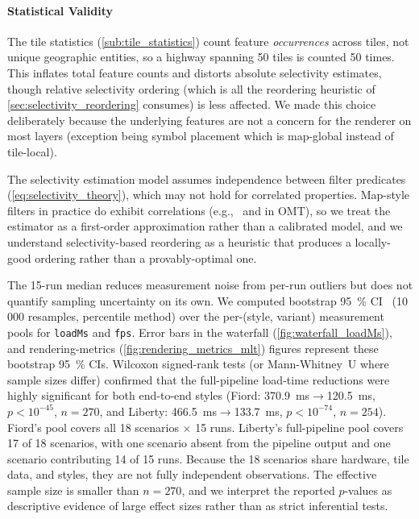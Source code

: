 \paragraph{Statistical Validity}
The tile statistics (\cref{sub:tile_statistics}) count feature \emph{occurrences} across tiles, not unique geographic entities, so a highway spanning 50 tiles is counted 50 times.
This inflates total feature counts and distorts absolute selectivity estimates, though relative selectivity ordering (which is all the reordering heuristic of \cref{sec:selectivity_reordering} consumes) is less affected.
We made this choice deliberately because the underlying features are not a concern for the renderer on most layers (exception being symbol placement which is map-global instead of tile-local).

The selectivity estimation model assumes independence between filter predicates (\cref{eq:selectivity_theory}), which may not hold for correlated properties.
Map-style filters in practice do exhibit correlations (e.g.,\  and  in \ac{OMT}), so we treat the estimator as a first-order approximation rather than a calibrated model, and we understand selectivity-based reordering as a heuristic that produces a locally-good ordering rather than a provably-optimal one.

The 15-run median reduces measurement noise from per-run outliers but does not quantify sampling uncertainty on its own.
We computed bootstrap \qty{95}{\percent} \ac{CI}~\cite{efronIntroductionBootstrap1998} (10\,000 resamples, percentile method) over the per-(style, variant) measurement pools for \texttt{loadMs} and \texttt{fps}.
Error bars in the waterfall (\cref{fig:waterfall_loadMs}), and rendering-metrics (\cref{fig:rendering_metrics_mlt}) figures represent these bootstrap \qty{95}{\percent} CIs.
Wilcoxon signed-rank tests (or Mann-Whitney~U where sample sizes differ) confirmed that the full-pipeline load-time reductions were highly significant for both end-to-end styles (Fiord: \qty{370.9}{\milli\second}$\to$\qty{120.5}{\milli\second}, $p < 10^{-45}$, $n = 270$, and Liberty: \qty{466.5}{\milli\second}$\to$\qty{133.7}{\milli\second}, $p < 10^{-74}$, $n = 254$).
Fiord's pool covers all 18 scenarios $\times$ 15 runs.
Liberty's full-pipeline pool covers 17 of 18 scenarios, with one scenario absent from the pipeline output and one scenario contributing 14 of 15 runs.
Because the 18 scenarios share hardware, tile data, and styles, they are not fully independent observations.
The effective sample size is smaller than $n = 270$, and we interpret the reported $p$-values as descriptive evidence of large effect sizes rather than as strict inferential tests.

